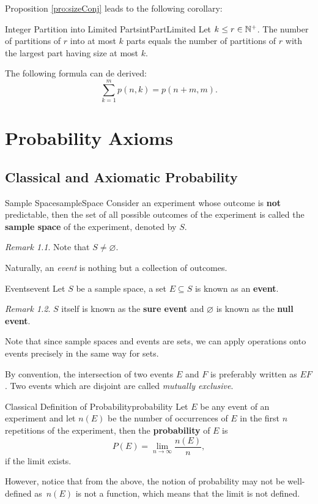 \documentclass[math]{amznotes}
\theoremstyle{remark}
\newtheorem*{remark}{Remark}
\newcommand{\0}{\mathbf{0}}
\newcommand{\1}{\mathbf{1}}
\begin{document}
Proposition \ref{pro:sizeConj} leads to the following corollary:
\begin{corbox}{Integer Partition into Limited Parts}{intPartLimited}
    Let $k \leq r \in \mathbb{N}^+$. The number of partitions of $r$ into at most $k$ parts equals the number of partitions of $r$ with the largest part having size at most $k$.
\end{corbox}
The following formula can de derived:
\begin{equation*}
    \sum_{k = 1}^{m}p(n, k) = p(n + m, m).
\end{equation*}
\chapter{Probability Axioms}
\section{Classical and Axiomatic Probability}
\begin{dfnbox}{Sample Space}{sampleSpace}
    Consider an experiment whose outcome is {\color{red} \textbf{not}} predictable, then the set of all possible outcomes of the experiment is called the {\color{red} \textbf{sample space}} of the experiment, denoted by $S$.
\end{dfnbox}
\begin{notebox}
    \begin{remark}
        Note that $S \neq \varnothing$.
    \end{remark}
\end{notebox}
Naturally, an \textit{event} is nothing but a collection of outcomes.
\begin{dfnbox}{Events}{event}
    Let $S$ be a sample space, a set $E \subseteq S$ is known as an {\color{red} \textbf{event}}.
\end{dfnbox}
\begin{notebox}
    \begin{remark}
        $S$ itself is known as the {\color{red} \textbf{sure event}} and $\varnothing$ is known as the {\color{red} \textbf{null event}}.
    \end{remark}
\end{notebox}
Note that since sample spaces and events are sets, we can apply operations onto events precisely in the same way for sets.

By convention, the intersection of two events $E$ and $F$ is preferably written as $EF$. Two events which are disjoint are called \textit{mutually exclusive}.
\begin{dfnbox}{Classical Definition of Probability}{probability}
    Let $E$ be any event of an experiment and let $n(E)$ be the number of occurrences of $E$ in the first $n$ repetitions of the experiment, then the {\color{red} \textbf{probability}} of $E$ is
    \begin{equation*}
        P(E) = \lim_{n \to \infty}\frac{n(E)}{n},
    \end{equation*}
    if the limit exists.
\end{dfnbox}
However, notice that from the above, the notion of probability may not be well-defined as~$n(E)$ is not a function, which means that the limit is not defined.
\end{document}
